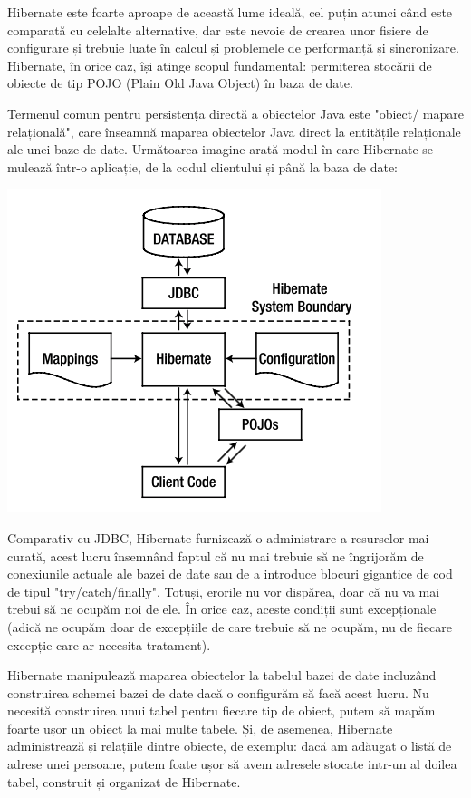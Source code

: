\documentclass[12pt]{book}
\begin{document}
Hibernate este foarte aproape de această lume ideală, cel puțin atunci când este comparată cu celelalte alternative, dar este nevoie de crearea unor fișiere de configurare și trebuie luate în calcul și problemele de performanță și sincronizare. Hibernate, în orice caz, își atinge scopul fundamental: permiterea stocării de obiecte de tip POJO (Plain Old Java Object) în baza de date. 

Termenul comun pentru persistența directă a obiectelor Java este "obiect/ mapare relațională", care înseamnă maparea obiectelor Java direct la entitățile relaționale ale unei baze de date. Următoarea imagine arată modul în care Hibernate se mulează într-o aplicație, de la codul clientului și până la baza de date:
\begin{center}
	\includegraphics{Hibernate}
\end{center}
\cite{BeginningHibernate}
Comparativ cu JDBC, Hibernate furnizează o administrare a resurselor mai curată, acest lucru însemnând faptul că nu mai trebuie să ne îngrijorăm de conexiunile actuale ale bazei de date sau de a introduce blocuri gigantice de cod de tipul "try/catch/finally".
Totuși, erorile nu vor dispărea, doar că nu va mai trebui să ne ocupăm noi de ele. În orice caz, aceste condiții sunt excepționale (adică ne ocupăm doar de excepțiile de care trebuie să ne ocupăm, nu de fiecare excepție care ar necesita tratament).

Hibernate manipulează maparea obiectelor la tabelul bazei de date incluzând construirea schemei bazei de date dacă o configurăm să facă acest lucru. Nu necesită construirea unui tabel pentru fiecare tip de obiect, putem să mapăm foarte ușor un obiect la mai multe tabele. Și, de asemenea, Hibernate administrează și relațiile dintre obiecte, de exemplu: dacă am adăugat o listă de adrese unei persoane, putem foate ușor să avem adresele stocate intr-un al doilea tabel, construit și organizat de Hibernate.
\end{document}
